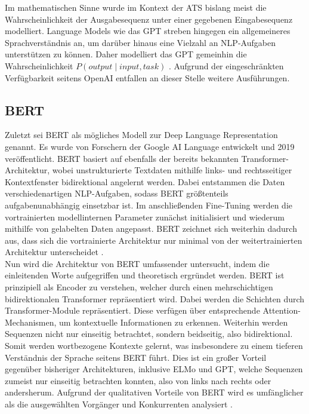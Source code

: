 \noindent
Im mathematischen Sinne wurde im Kontext der \ac{ATS} bislang meist die Wahrscheinlichkeit der Ausgabesequenz unter einer gegebenen Eingabesequenz modelliert. Language Models wie das \ac{GPT} streben hingegen ein allgemeineres Sprachverständnis an, um darüber hinaus eine Vielzahl an \ac{NLP}-Aufgaben unterstützen zu können. Daher modelliert das \ac{GPT} gemeinhin die Wahrscheinlichkeit $P(output \mid input, task)$ \cite[S.~2]{RAD19}. Aufgrund der eingeschränkten Verfügbarkeit seitens OpenAI entfallen an dieser Stelle weitere Ausführungen.


\subsection{BERT}
\noindent
Zuletzt sei \ac{BERT} als mögliches Modell zur Deep Language Representation genannt. Es wurde von Forschern der Google AI Language entwickelt und 2019 veröffentlicht. \ac{BERT} basiert auf ebenfalls der bereits bekannten Transformer-Architektur, wobei unstrukturierte Textdaten mithilfe links- und rechtsseitiger Kontextfenster bidirektional angelernt werden. Dabei entstammen die Daten verschiedenartigen \ac{NLP}-Aufgaben, sodass \ac{BERT} größtenteils aufgabenunabhängig einsetzbar ist. Im anschließenden Fine-Tuning werden die vortrainierten modellinternen Parameter zunächst initialisiert und wiederum mithilfe von gelabelten Daten angepasst. \ac{BERT} zeichnet sich weiterhin dadurch aus, dass sich die vortrainierte Architektur nur minimal von der weitertrainierten Architektur unterscheidet \cite[S.~1-3]{DEV19}.\\

\noindent
Nun wird die Architektur von \ac{BERT} umfassender untersucht, indem die einleitenden Worte aufgegriffen und theoretisch ergründet werden. \ac{BERT} ist prinzipiell als Encoder zu verstehen, welcher durch einen mehrschichtigen bidirektionalen Transformer repräsentiert wird. Dabei werden die Schichten durch Transformer-Module repräsentiert. Diese verfügen über entsprechende Attention-Mechanismen, um kontextuelle Informationen zu erkennen. Weiterhin werden Sequenzen nicht nur einseitig betrachtet, sondern beidseitig, also bidirektional. Somit werden wortbezogene Kontexte gelernt, was insbesondere zu einem tieferen Verständnis der Sprache seitens \ac{BERT} führt. Dies ist ein großer Vorteil gegenüber bisheriger Architekturen, inklusive \ac{ELMo} und \ac{GPT}, welche Sequenzen zumeist nur einseitig betrachten konnten, also von links nach rechts oder andersherum. Aufgrund der qualitativen Vorteile von \ac{BERT} wird es umfänglicher als die ausgewählten Vorgänger und Konkurrenten analysiert \cite[S.~3]{DEV19}.
\newpage

